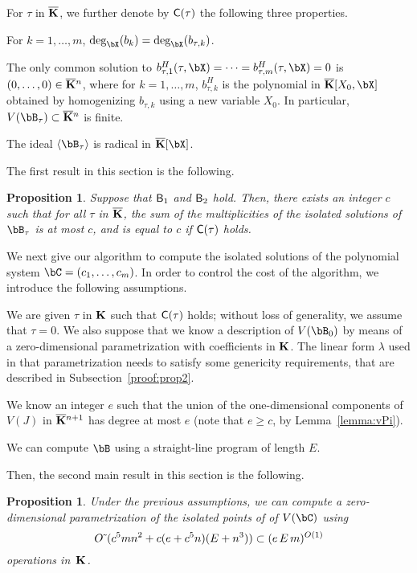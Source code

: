 \documentclass[12pt]{article}
\newtheorem{proposition}[definition]{Proposition}
\begin{document}
For $\tau$ in $\overline{\mathbf{K}}$, we further denote by $\mathsf{C}(\tau)$ the
following three properties.
\begin{description}[leftmargin=*]
\item[$\assG_1(\tau).$] For $k=1,\dots,m$,
  $\deg_\bX(b_k)=\deg_\bX(b_{\tau,k})$.
\item[$\assG_2(\tau).$] The only common solution to
  $b_{\tau,1}^H(\tau,\bX)=\cdots=b_{\tau,m}^H(\tau,\bX)=0$ is
  $(0,\dots,0)\in\overline{\mathbf{K}}{}^n$, where for $k=1,\dots,m$, $b_{\tau,k}^H$ is
  the polynomial in $\KKbar[X_0,\bX]$ obtained by homogenizing
  $b_{\tau,k}$ using a new variable $X_0$. In particular, $V(\bB_\tau)
  \subset \KKbar{}^n$ is finite.
\item[$\assG_3(\tau).$] The ideal $\langle \bB_\tau \rangle$ is
  radical in $\KKbar[\bX]$.
\end{description}

The first result in this section is the following.
\begin{proposition}\label{prop:degree_fiber}
  Suppose that $\mathsf{B}_1$ and $\mathsf{B}_2$ hold. Then, there exists an
  integer $c$ such that for all $\tau$ in $\overline{\mathbf{K}}$, the sum of the
  multiplicities of the isolated solutions of $\bB_\tau$ is at most
  $c$, and is equal to $c$ if $\mathsf{C}(\tau)$ holds.
\end{proposition}

We next give our algorithm to compute the isolated solutions of the
polynomial system $\bC=(c_1,\dots,c_m)$. In order to control the cost
of the algorithm, we introduce the following assumptions.
\begin{description}[leftmargin=*]
\item[${\assD}_1$.] We are given $\tau$ in $\mathbf{K}$ such that
  $\mathsf{C}(\tau)$ holds; without loss of generality, we assume that
  $\tau=0$. We also suppose that we know a description of $V(\bB_{0})$
  by means of a zero-dimensional parametrization with coefficients in
  $\mathbf{K}$. The linear form $\lambda$ used in that parametrization needs
  to satisfy some genericity requirements, that are described in
  Subsection~\ref{proof:prop2}.
\item[${\assD}_2$.] We know an integer $e$ such that the union of the
  one-dimensional components of $V(J)$ in $\overline{\mathbf{K}}{}^{n+1}$ has degree
  at most $e$ (note that $e \ge c$, by Lemma~\ref{lemma:vPi}).
\item[${\assD}_3$.] We can compute $\bB$ using a straight-line program
  of length $E$.
\end{description}
Then, the second main result in this section is the following.
\begin{proposition}\label{prop:compute_isolated}
  Under the previous assumptions, we can compute a zero-dimensional
  parametrization of the isolated points of 
 of $V(\bC)$ using
$${O}{\,\tilde{ }\,}(c^5 m n^2  + c(e+c^5 n)(E + n^3)) \subset (e\,E\,m)^{O(1)}$$ operations in~$\mathbf{K}$.
\end{proposition}
\end{document}
